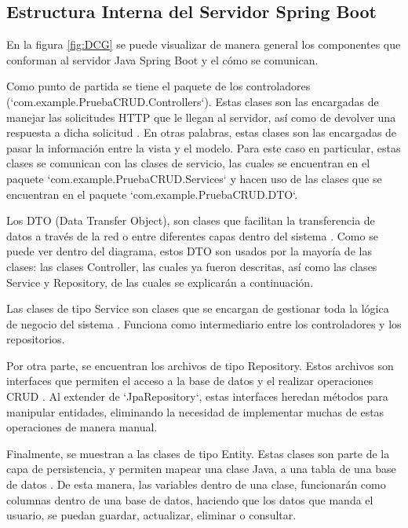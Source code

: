 \subsection{Estructura Interna del Servidor Spring Boot}
En la figura \ref{fig:DCG} se puede visualizar de manera general los componentes que conforman al servidor Java Spring Boot y el cómo se comunican.

Como punto de partida se tiene el paquete de los controladores (`com.example.PruebaCRUD.Controllers`). Estas clases son las encargadas de manejar las solicitudes HTTP que le llegan al servidor, así como de devolver una respuesta a dicha solicitud \cite{SpringController}. En otras palabras, estas clases son las encargadas de pasar la información entre la vista y el modelo. Para este caso en particular, estas clases se comunican con las clases de servicio, las cuales se encuentran en el paquete `com.example.PruebaCRUD.Services` y hacen uso de las clases que se encuentran en el paquete `com.example.PruebaCRUD.DTO`. 

Los DTO (Data Transfer Object), son clases que facilitan la transferencia de datos a través de la red o entre diferentes capas dentro del sistema \cite{DTO}. Como se puede ver dentro del diagrama, estos DTO son usados por la mayoría de las clases: las clases Controller, las cuales ya fueron descritas, así como las clases Service y Repository, de las cuales se explicarán a continuación.

Las clases de tipo Service son clases que se encargan de gestionar toda la lógica de negocio del sistema \cite{yadav-2024}. Funciona como intermediario entre los controladores y los repositorios.

Por otra parte, se encuentran los archivos de tipo Repository. Estos archivos son interfaces que permiten el acceso a la base de datos y el realizar operaciones CRUD \cite{diaz-2023}. Al extender de `JpaRepository`, estas interfaces heredan métodos para manipular entidades, eliminando la necesidad de implementar muchas de estas operaciones de manera manual.

Finalmente, se muestran a las clases de tipo Entity. Estas clases son parte de la capa de persistencia, y permiten mapear una clase Java, a una tabla de una base de datos \cite{pavan-2024}. De esta manera, las variables dentro de una clase, funcionarán como columnas dentro de una base de datos, haciendo que los datos que manda el usuario, se puedan guardar, actualizar, eliminar o consultar.

\newpage

